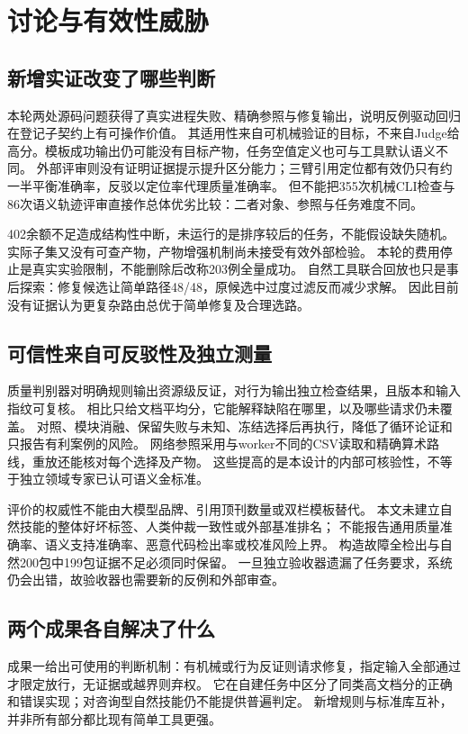 \section{讨论与有效性威胁}
\subsection{新增实证改变了哪些判断}
本轮两处源码问题获得了真实进程失败、精确参照与修复输出，说明反例驱动回归在登记子契约上有可操作价值。
其适用性来自可机械验证的目标，不来自Judge给高分。模板成功输出仍可能没有目标产物，任务空值定义也可与工具默认语义不同。
外部评审则没有证明证据提示提升区分能力；三臂引用定位都有效仍只有约一半平衡准确率，反驳以定位率代理质量准确率。
但不能把355次机械CLI检查与86次语义轨迹评审直接作总体优劣比较：二者对象、参照与任务难度不同。

402余额不足造成结构性中断，未运行的是排序较后的任务，不能假设缺失随机。
实际子集又没有可查产物，产物增强机制尚未接受有效外部检验。
本轮的费用停止是真实实验限制，不能删除后改称203例全量成功。
自然工具联合回放也只是事后探索：修复候选让简单路径48/48，原候选中过度过滤反而减少求解。
因此目前没有证据认为更复杂路由总优于简单修复及合理选路。

\subsection{可信性来自可反驳性及独立测量}
质量判别器对明确规则输出资源级反证，对行为输出独立检查结果，且版本和输入指纹可复核。
相比只给文档平均分，它能解释缺陷在哪里，以及哪些请求仍未覆盖。
对照、模块消融、保留失败与未知、冻结选择后再执行，降低了循环论证和只报告有利案例的风险。
网络参照采用与worker不同的CSV读取和精确算术路线，重放还能核对每个选择及产物。
这些提高的是本设计的内部可核验性，不等于独立领域专家已认可语义金标准。

评价的权威性不能由大模型品牌、引用顶刊数量或双栏模板替代。
本文未建立自然技能的整体好坏标签、人类仲裁一致性或外部基准排名；
不能报告通用质量准确率、语义支持准确率、恶意代码检出率或校准风险上界。
构造故障全检出与自然200包中199包证据不足必须同时保留。
一旦独立验收器遗漏了任务要求，系统仍会出错，故验收器也需要新的反例和外部审查。

\subsection{两个成果各自解决了什么}
成果一给出可使用的判断机制：有机械或行为反证则请求修复，指定输入全部通过才限定放行，无证据或越界则弃权。
它在自建任务中区分了同类高文档分的正确和错误实现；对咨询型自然技能仍不能提供普遍判定。
新增规则与标准库互补，并非所有部分都比现有简单工具更强。

